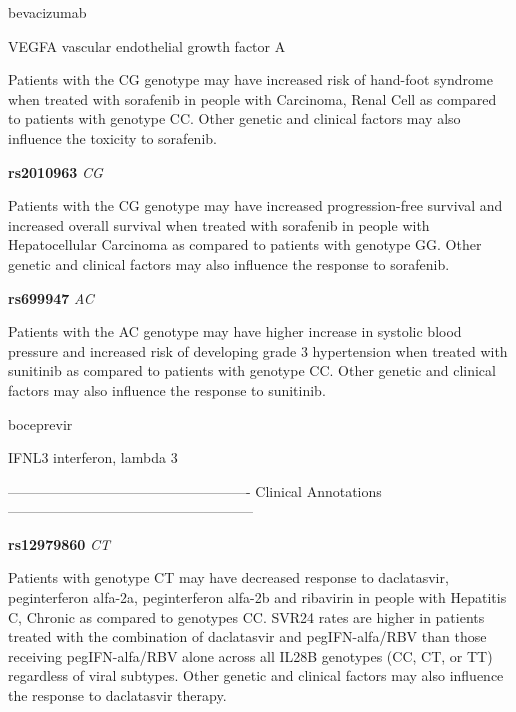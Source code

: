 \documentclass{resume} %
\begin{document}
\begin{rSection}{ bevacizumab }
\begin{rSubsection}{ VEGFA }{ vascular endothelial growth factor A }{}{}
\item[] Patients with the CG genotype may have increased risk of hand-foot syndrome when treated with sorafenib in people with Carcinoma, Renal Cell as compared to patients with genotype CC. Other genetic and clinical factors may also influence the toxicity to sorafenib.\item \textbf{ rs2010963 } \textit{ CG }
\item[] Patients with the CG genotype may have increased progression-free survival and increased overall survival when treated with sorafenib in people with Hepatocellular Carcinoma as compared to patients with genotype GG. Other genetic and clinical factors may also influence the response to sorafenib.\item \textbf{ rs699947 } \textit{ AC }
\item[] Patients with the AC genotype may have higher increase in systolic blood pressure and increased risk of developing grade 3 hypertension when treated with sunitinib as compared to patients with genotype CC. Other genetic and clinical factors may also influence the response to sunitinib.
\end{rSubsection}

\end{rSection}\begin{rSection}{ boceprevir }
\item[]

\begin{rSubsection}{ IFNL3 }{ interferon, lambda 3 }{}{}
\item[]

\item[] ---------------------------------------------------- Clinical Annotations -----------------------------------------------------\newline
\item \textbf{ rs12979860 } \textit{ CT }
\item[] Patients with genotype CT may have decreased response to daclatasvir, peginterferon alfa-2a, peginterferon alfa-2b and ribavirin in people with Hepatitis C, Chronic as compared to genotypes CC. SVR24 rates are higher in patients treated with the combination of daclatasvir and pegIFN-alfa/RBV than those receiving pegIFN-alfa/RBV alone across all IL28B genotypes (CC, CT, or TT) regardless of viral subtypes. Other genetic and clinical factors may also influence the response to daclatasvir therapy.
\end{rSubsection}


\end{rSection}
\end{document}
